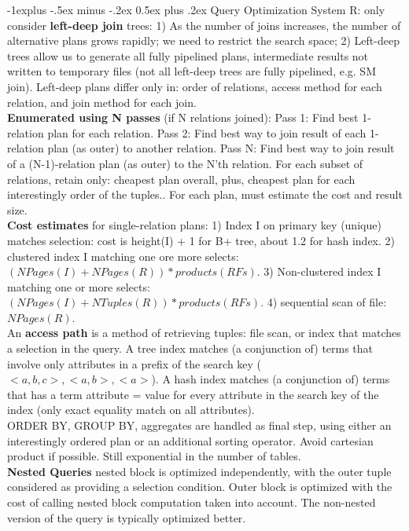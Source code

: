 \documentclass[10pt,landscape]{article}
\makeatletter
\renewcommand{\subsection}{\@startsection{subsection}{2}{0mm}%
                                {-1explus -.5ex minus -.2ex}%
                                {0.5ex plus .2ex}%
                                {\normalfont\normalsize\bfseries}}
\makeatother
\begin{document}
\begin{multicols}{3}
\subsection{Query Optimization}
System R: only consider {\bf left-deep join} trees: 1) As the number of joins increases, the number of alternative plans grows rapidly; we need to restrict the search space; 2) Left-deep trees allow us to generate all fully pipelined plans, intermediate results not written to temporary files (not all left-deep trees are fully pipelined, e.g. SM join). Left-deep plans differ only in: order of relations, access method for each relation, and join method for each join.\\
{\bf Enumerated using N passes} (if N relations joined): Pass 1: Find best 1-relation plan for each relation. Pass 2: Find best way to join result of each 1-relation plan (as outer) to another relation. Pass N: Find best way to join result of a (N-1)-relation plan (as outer) to the N'th relation. For each subset of relations, retain only: cheapest plan overall, plus, cheapest plan for each interestingly order of the tuples.. For each plan, must estimate the cost and result size.\\
{\bf Cost estimates} for single-relation plans: 1) Index I on primary key (unique) matches selection: cost is height(I) + 1 for B+ tree, about 1.2 for hash index. 2) clustered index I matching one ore more selects: $(NPages(I)+NPages(R))*products(RFs)$. 3) Non-clustered index I matching one or more selects: $(NPages(I)+NTuples(R))*products(RFs)$. 4) sequential scan of file: $NPages(R)$.\\
An {\bf access path} is a method of retrieving tuples: file scan, or index that matches a selection in the query. A tree index matches (a conjunction of) terms that involve only attributes in a prefix of the search key ($<a,b,c>, <a, b>, <a>$). A hash index matches (a conjunction of) terms that has a term attribute = value for every attribute in the search key of the index (only exact equality match on all attributes).\\
ORDER BY, GROUP BY, aggregates are handled as final step, using either an interestingly ordered plan or an additional sorting operator. Avoid cartesian product if possible. Still exponential in the number of tables.\\
{\bf Nested Queries} nested block is optimized independently, with the outer tuple considered as providing a selection condition. Outer block is optimized with the cost of calling nested block computation taken into account. The non-nested version of the query is typically optimized better.


\end{multicols}
\end{document}

